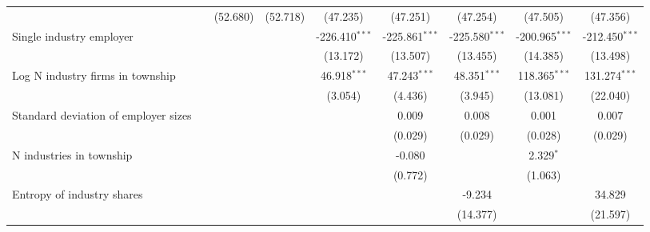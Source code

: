 \begin{tabular}{lcccccccc}
                                                         &                 & (52.680)        & (52.718)        & (47.235)         & (47.251)         & (47.254)         & (47.505)         & (47.356)\\   
   Single industry employer                              &                 &                 &                 & -226.410$^{***}$ & -225.861$^{***}$ & -225.580$^{***}$ & -200.965$^{***}$ & -212.450$^{***}$\\   
                                                         &                 &                 &                 & (13.172)         & (13.507)         & (13.455)         & (14.385)         & (13.498)\\   
   Log N industry firms in township                      &                 &                 &                 & 46.918$^{***}$   & 47.243$^{***}$   & 48.351$^{***}$   & 118.365$^{***}$  & 131.274$^{***}$\\   
                                                         &                 &                 &                 & (3.054)          & (4.436)          & (3.945)          & (13.081)         & (22.040)\\   
   Standard deviation of employer sizes                  &                 &                 &                 &                  & 0.009            & 0.008            & 0.001            & 0.007\\   
                                                         &                 &                 &                 &                  & (0.029)          & (0.029)          & (0.028)          & (0.029)\\   
   N industries in township                              &                 &                 &                 &                  & -0.080           &                  & 2.329$^{*}$      &   \\   
                                                         &                 &                 &                 &                  & (0.772)          &                  & (1.063)          &   \\   
   Entropy of industry shares                            &                 &                 &                 &                  &                  & -9.234           &                  & 34.829\\   
                                                         &                 &                 &                 &                  &                  & (14.377)         &                  & (21.597)\\   

\end{tabular}
